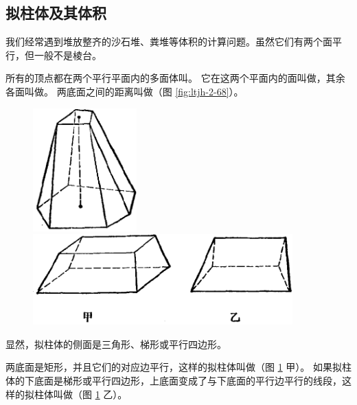 \begin{starred}
\subsection{拟柱体及其体积}\label{subsec:2-11}
\end{starred}
\begin{enhancedline}

我们经常遇到堆放整齐的沙石堆、粪堆等体积的计算问题。虽然它们有两个面平行，但一般不是棱台。

所有的顶点都在两个平行平面内的多面体叫。
它在这两个平面内的面叫做，其余各面叫做。
两底面之间的距离叫做（图 \ref{fig:ltjh-2-68}）。


\begin{figure}[htbp]
    \centering
    \begin{minipage}[b]{4cm}
        \centering
        \includegraphics[width=4cm]{../pic/ltjh-ch2-68.png}
        \caption{}\label{fig:ltjh-2-68}
    \end{minipage}
    \qquad \qquad
    \begin{minipage}[b]{10cm}
        \centering
        \includegraphics[width=10cm]{../pic/ltjh-ch2-69.png}
        \caption{}\label{fig:ltjh-2-69}
    \end{minipage}
\end{figure}

显然，拟柱体的侧面是三角形、梯形或平行四边形。

两底面是矩形，并且它们的对应边平行，这样的拟柱体叫做（图 \ref{fig:ltjh-2-69} 甲）。
如果拟柱体的下底面是梯形或平行四边形，上底面变成了与下底面的平行边平行的线段，这样的拟柱体叫做（图 \ref{fig:ltjh-2-69} 乙）。


\end{enhancedline}
